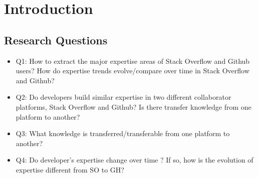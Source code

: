 \chapter{Introduction}
\section{Research Questions}

\begin{itemize}
    \item Q1: How to extract the major expertise areas of Stack Overflow and Github users? How do expertise trends evolve/compare over time in Stack Overflow and Github?
    \item Q2: Do developers build similar expertise in two different collaborator platforms, Stack Overflow and Github? Is there transfer knowledge from one platform to another?
    \item Q3: What knowledge is transferred/transferable from one platform to another?
    \item Q4: Do developer's expertise change over time ? If so, how is the evolution of expertise different from SO to GH?
\end{itemize}
